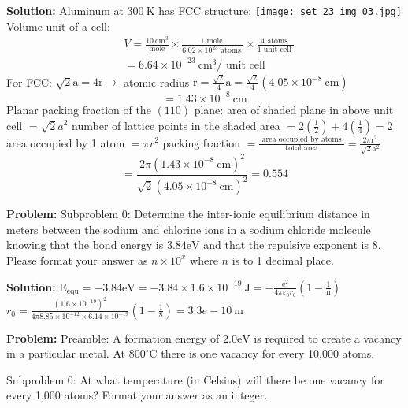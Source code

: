 \documentclass[10pt]{article}
\begin{document}
\textbf{Solution:}
Aluminum at $300 \mathrm{~K}$ has FCC structure:
\texttt{[image: set\_23\_img\_03.jpg]}
\nonessentialimage
Volume unit of a cell:
\[
\begin{aligned}
&V=\frac{10 \mathrm{~cm}^{3}}{\text { mole }} \times \frac{1 \text { mole }}{6.02 \times 10^{23} \text { atoms }} \times \frac{4 \text { atoms }}{1 \text { unit cell }} \\
&=6.64 \times 10^{-23} \mathrm{~cm}^{3} / \text { unit cell }
\end{aligned}
\]
For FCC: $\sqrt{2} \mathrm{a}=4 \mathrm{r} \rightarrow$ atomic radius $\mathrm{r}=\frac{\sqrt{2}}{4} \mathrm{a}=\frac{\sqrt{2}}{4}\left(4.05 \times 10^{-8} \mathrm{~cm}\right)$
\[
=1.43 \times 10^{-8} \mathrm{~cm}
\]
Planar packing fraction of the $(110)$ plane:
area of shaded plane in above unit cell $=\sqrt{2} a^{2}$
number of lattice points in the shaded area $=2\left(\frac{1}{2}\right)+4\left(\frac{1}{4}\right)=2$
area occupied by 1 atom $=\pi r^{2}$
packing fraction $=\frac{\text { area occupied by atoms }}{\text { total area }}=\frac{2 \pi \mathrm{r}^{2}}{\sqrt{2} \mathrm{a}^{2}}$
\[
=\frac{2 \pi\left(1.43 \times 10^{-8} \mathrm{~cm}\right)^{2}}{\sqrt{2}\left(4.05 \times 10^{-8} \mathrm{~cm}\right)^{2}}= \boxed{0.554}
\]


\textbf{Problem:}
Subproblem 0: Determine the inter-ionic equilibrium distance in meters between the sodium and chlorine ions in a sodium chloride molecule knowing that the bond energy is $3.84 \mathrm{eV}$ and that the repulsive exponent is 8. Please format your answer as $n \times 10^x$ where $n$ is to 1 decimal place.


\textbf{Solution:}
$\mathrm{E}_{\mathrm{equ}}=-3.84 \mathrm{eV}=-3.84 \times 1.6 \times 10^{-19} \mathrm{~J}=-\frac{\mathrm{e}^{2}}{4 \pi \varepsilon_{0} r_{0}}\left(1-\frac{1}{\mathrm{n}}\right)$
\\
$r_{0}=\frac{\left(1.6 \times 10^{-19}\right)^{2}}{4 \pi 8.85 \times 10^{-12} \times 6.14 \times 10^{-19}}\left(1-\frac{1}{8}\right)= 
\boxed{3.3e-10} \mathrm{~m}$


\textbf{Problem:}
Preamble: A formation energy of $2.0 \mathrm{eV}$ is required to create a vacancy in a particular metal. At $800^{\circ} \mathrm{C}$ there is one vacancy for every 10,000 atoms.

Subproblem 0: At what temperature (in Celsius) will there be one vacancy for every 1,000 atoms? Format your answer as an integer. 
\end{document}
